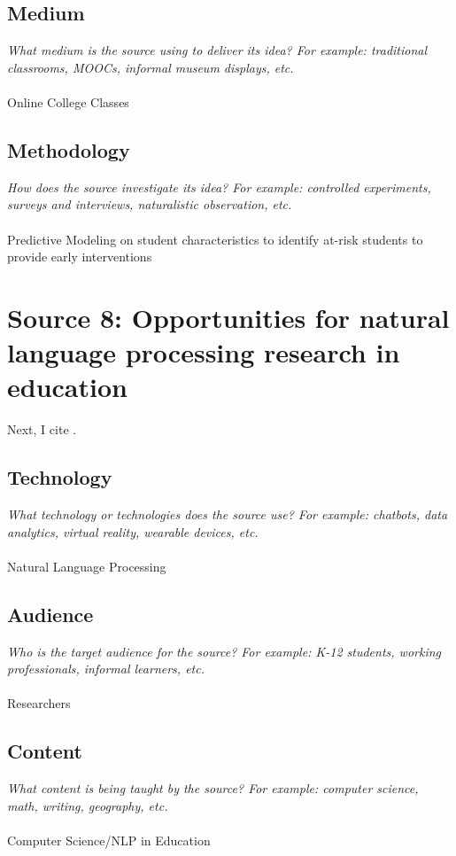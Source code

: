 \documentclass[12pt, final]{article}
\begin{document}
\subsection{Medium}
\textit{What medium is the source using to deliver its idea? For example: traditional classrooms, MOOCs, informal museum displays, etc.}
\\
\\
Online College Classes

\subsection{Methodology}
\textit{How does the source investigate its idea? For example: controlled experiments, surveys and interviews, naturalistic observation, etc.}
\\
\\
Predictive Modeling on student characteristics to identify at-risk students to provide early interventions

\section{Source 8: Opportunities for natural language processing research in education}
\label{Source 8}

Next, I cite \cite{Burstein}.

\subsection{Technology}
\textit{What technology or technologies does the source use? For example: chatbots, data analytics, virtual reality, wearable devices, etc.}
\\
\\
Natural Language Processing

\subsection{Audience}
\textit{Who is the target audience for the source? For example: K-12 students, working professionals, informal learners, etc.}
\\
\\
Researchers

\subsection{Content}
\textit{What content is being taught by the source? For example: computer science, math, writing, geography, etc.}
\\
\\
Computer Science/NLP in Education
\end{document}
